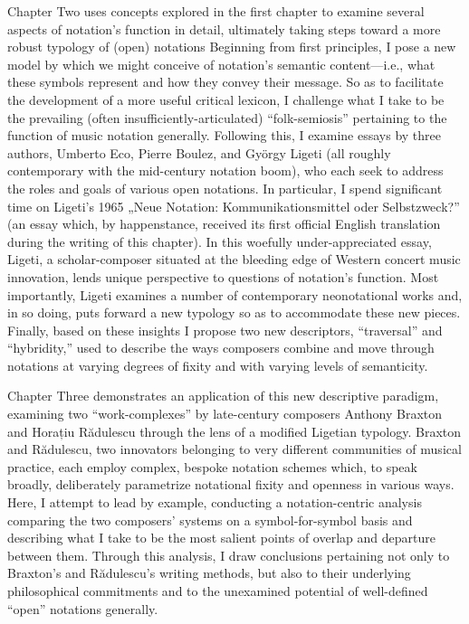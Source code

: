 Chapter Two uses concepts explored in the first chapter to examine several aspects of notation's function in detail, ultimately taking steps toward a more robust typology of (open) notations
Beginning from first principles, I pose a new model by which we might conceive of notation's semantic content---i.e., what these symbols represent and how they convey their message.
So as to facilitate the development of a more useful critical lexicon, I challenge what I take to be the prevailing (often insufficiently-articulated) ``folk-semiosis'' pertaining to the function of music notation generally.
Following this, I examine essays by three authors, Umberto Eco, Pierre Boulez, and Gy\"{o}rgy Ligeti (all roughly contemporary with the mid-century notation boom), who each seek to address the roles and goals of various open notations. 
In particular, I spend significant time on Ligeti's 1965 „Neue Notation: Kommunikationsmittel oder Selbstzweck?” (an essay which, by happenstance, received its first official English translation during the writing of this chapter).
In this woefully under-appreciated essay, Ligeti, a scholar-composer situated at the bleeding edge of Western concert music innovation, lends unique perspective to questions of notation's function.
Most importantly, Ligeti examines a number of contemporary neonotational works and, in so doing, puts forward a new typology so as to accommodate these new pieces.
Finally, based on these insights I propose two new descriptors, ``traversal'' and ``hybridity,'' used to describe the ways composers combine and move through notations at varying degrees of fixity and with varying levels of semanticity. 

Chapter Three demonstrates an application of this new descriptive paradigm, examining two ``work-complexes'' by late-century composers Anthony Braxton and Horațiu R\u{a}dulescu through the lens of a modified Ligetian typology.
Braxton and R\u{a}dulescu, two innovators belonging to very different communities of musical practice, each employ complex, bespoke notation schemes which, to speak broadly, deliberately parametrize notational fixity and openness in various ways.
Here, I attempt to lead by example, conducting a notation-centric analysis comparing the two composers' systems on a symbol-for-symbol basis and describing what I take to be the most salient points of overlap and departure between them.
Through this analysis, I draw conclusions pertaining not only to Braxton's and R\u{a}dulescu's writing methods, but also to their underlying philosophical commitments and to the unexamined potential of well-defined ``open'' notations generally.

